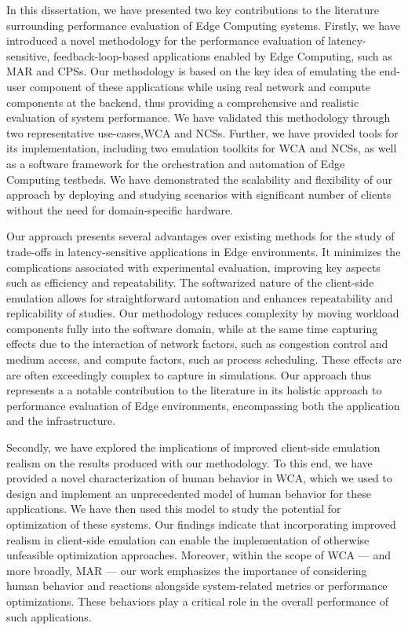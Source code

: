 In this dissertation, we have presented two key contributions to the literature surrounding performance evaluation of Edge Computing systems.
Firstly, we have introduced a novel methodology for the performance evaluation of latency-sensitive, feedback-loop-based applications enabled by Edge Computing, such as \gls{MAR} and \glspl{CPS}.
Our methodology is based on the key idea of emulating the end-user component of these applications while using real network and compute components at the backend, thus providing a comprehensive and realistic evaluation of system performance.
We have validated this methodology through two representative use-cases,\gls{WCA} and \glspl{NCS}.
Further, we have provided tools for its implementation, including two emulation toolkits for \gls{WCA} and \glspl{NCS}, as well as a software framework for the orchestration and automation of Edge Computing testbeds.
We have demonstrated the scalability and flexibility of our approach by deploying and studying scenarios with significant number of clients without the need for domain-specific hardware.

Our approach presents several advantages over existing methods for the study of trade-offs in latency-sensitive applications in Edge environments.
It minimizes the complications associated with experimental evaluation, improving key aspects such as efficiency and repeatability.
The softwarized nature of the client-side emulation allows for straightforward automation and enhances repeatability and replicability of studies.
Our methodology reduces complexity by moving workload components fully into the software domain, while at the same time capturing effects due to the interaction of network factors, such as congestion control and medium access, and compute factors, such as process scheduling.
These effects are are often exceedingly complex to capture in simulations.
Our approach thus represents a a notable contribution to the literature in its holistic approach to performance evaluation of Edge environments, encompassing both the application and the infrastructure.

Secondly, we have explored the implications of improved client-side emulation realism on the results produced with our methodology.
To this end, we have provided a novel characterization of human behavior in \gls{WCA}, which we used to design and implement an unprecedented model of human behavior for these applications.
We have then used this model to study the potential for optimization of these systems.
Our findings indicate that incorporating improved realism in client-side emulation can enable the implementation of otherwise unfeasible optimization approaches.
Moreover, within the scope of \gls{WCA} --- and more broadly, \gls{MAR} --- our work emphasizes the importance of considering human behavior and reactions alongside system-related metrics or performance optimizations.
These behaviors play a critical role in the overall performance of such applications.

